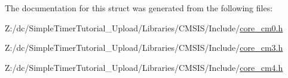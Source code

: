 The documentation for this struct was generated from the following files\-:\begin{DoxyCompactItemize}
\item 
Z\-:/dc/\-Simple\-Timer\-Tutorial\-\_\-\-Upload/\-Libraries/\-C\-M\-S\-I\-S/\-Include/\hyperlink{core__cm0_8h}{core\-\_\-cm0.\-h}\item 
Z\-:/dc/\-Simple\-Timer\-Tutorial\-\_\-\-Upload/\-Libraries/\-C\-M\-S\-I\-S/\-Include/\hyperlink{core__cm3_8h}{core\-\_\-cm3.\-h}\item 
Z\-:/dc/\-Simple\-Timer\-Tutorial\-\_\-\-Upload/\-Libraries/\-C\-M\-S\-I\-S/\-Include/\hyperlink{core__cm4_8h}{core\-\_\-cm4.\-h}\end{DoxyCompactItemize}

